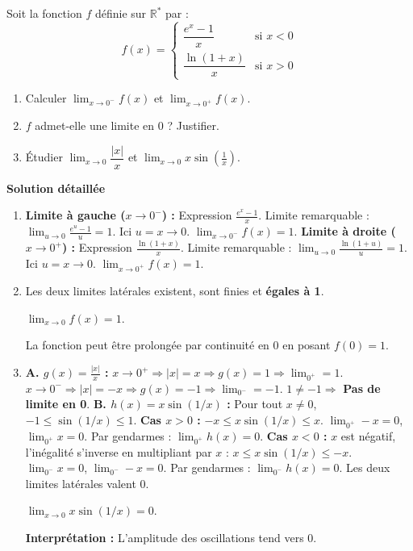 \documentclass[11pt]{article}
\begin{document}
\begin{exoresolu}
    Soit la fonction $f$ définie sur $\mathbb{R}^*$ par :
    \[ f(x) = \begin{cases} \dfrac{e^x - 1}{x} & \text{si } x < 0 \\ \dfrac{\ln(1+x)}{x} & \text{si } x > 0 \end{cases} \]
    \begin{enumerate}
        \item Calculer $\lim_{x\to 0^-} f(x)$ et $\lim_{x\to 0^+} f(x)$.
        \item $f$ admet-elle une limite en $0$ ? Justifier.
        \item Étudier $\lim_{x\to 0} \dfrac{|x|}{x}$ et $\lim_{x\to 0} x \sin\left(\frac{1}{x}\right)$.
    \end{enumerate}
    \tcblower
    \textbf{Solution détaillée}
    \begin{enumerate}
        \item \textbf{Limite à gauche ($x\to 0^-$) :} Expression $\frac{e^x - 1}{x}$.
              Limite remarquable : $\lim_{u\to 0} \frac{e^u - 1}{u} = 1$. Ici $u=x\to 0$.
              $\lim_{x\to 0^-} f(x) = 1$.
              \textbf{Limite à droite ($x\to 0^+$) :} Expression $\frac{\ln(1+x)}{x}$.
              Limite remarquable : $\lim_{u\to 0} \frac{\ln(1+u)}{u} = 1$. Ici $u=x\to 0$.
              $\lim_{x\to 0^+} f(x) = 1$.
        \item Les deux limites latérales existent, sont finies et \textbf{égales à 1}.
              \begin{aretenir}
                  $\lim_{x\to 0} f(x) = 1$.
              \end{aretenir}
              La fonction peut être prolongée par continuité en 0 en posant $f(0)=1$.
        \item \textbf{A. $g(x) = \frac{|x|}{x}$ :}
              $x\to 0^+ \Rightarrow |x|=x \Rightarrow g(x)=1 \Rightarrow \lim_{0^+} = 1$.
              $x\to 0^- \Rightarrow |x|=-x \Rightarrow g(x)=-1 \Rightarrow \lim_{0^-} = -1$.
              $1 \neq -1 \Rightarrow$ \textbf{Pas de limite en 0}.
              \textbf{B. $h(x) = x \sin(1/x)$ :}
              Pour tout $x \neq 0$, $-1 \le \sin(1/x) \le 1$.
              \textbf{Cas $x>0$ :} $-x \le x\sin(1/x) \le x$. $\lim_{0^+} -x = 0$, $\lim_{0^+} x = 0$. Par gendarmes : $\lim_{0^+} h(x) = 0$.
              \textbf{Cas $x<0$ :} $x$ est négatif, l'inégalité s'inverse en multipliant par $x$ : $x \le x\sin(1/x) \le -x$. $\lim_{0^-} x = 0$, $\lim_{0^-} -x = 0$. Par gendarmes : $\lim_{0^-} h(x) = 0$.
              Les deux limites latérales valent 0.
              \begin{aretenir}
                  $\lim_{x\to 0} x \sin(1/x) = 0$.
              \end{aretenir}
              \textbf{Interprétation :} L'amplitude des oscillations tend vers 0.
    \end{enumerate}
\end{exoresolu}
\end{document}
